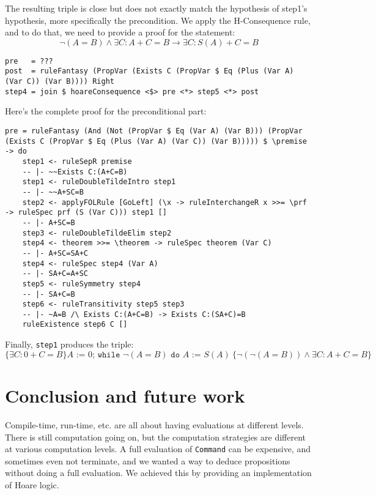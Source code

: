 \documentclass{article}
\begin{document}
The resulting triple is close but does not exactly match the hypothesis of step1's hypothesis, more specifically the precondition. We apply the H-Consequence rule, and to do that, we need to provide a proof for the statement:
$$\neg (A = B) \land \exists C: A + C = B \to \exists C: S(A) + C = B$$

\begin{lstlisting}
pre   = ???
post  = ruleFantasy (PropVar (Exists C (PropVar $ Eq (Plus (Var A) (Var C)) (Var B)))) Right
step4 = join $ hoareConsequence <$> pre <*> step5 <*> post
\end{lstlisting}

Here's the complete proof for the preconditional part:

\begin{lstlisting}
pre = ruleFantasy (And (Not (PropVar $ Eq (Var A) (Var B))) (PropVar (Exists C (PropVar $ Eq (Plus (Var A) (Var C)) (Var B))))) $ \premise -> do
    step1 <- ruleSepR premise
    -- |- ~~Exists C:(A+C=B)
    step1 <- ruleDoubleTildeIntro step1
    -- |- ~~A+SC=B
    step2 <- applyFOLRule [GoLeft] (\x -> ruleInterchangeR x >>= \prf -> ruleSpec prf (S (Var C))) step1 []
    -- |- A+SC=B
    step3 <- ruleDoubleTildeElim step2
    step4 <- theorem >>= \theorem -> ruleSpec theorem (Var C)
    -- |- A+SC=SA+C
    step4 <- ruleSpec step4 (Var A)
    -- |- SA+C=A+SC
    step5 <- ruleSymmetry step4
    -- |- SA+C=B
    step6 <- ruleTransitivity step5 step3
    -- |- ~A=B /\ Exists C:(A+C=B) -> Exists C:(SA+C)=B
    ruleExistence step6 C []
\end{lstlisting}

Finally, \texttt{step1} produces the triple:
$$\{\exists C: 0+C=B\} A \texttt{ := } 0 \texttt{; while } \neg(A = B) \texttt{ do }A\texttt{ := }S(A) \ \{\neg (\neg (A = B)) \land \exists C: A + C = B\}$$

\section{Conclusion and future work}

Compile-time, run-time, etc. are all about having evaluations at different levels. There is still computation going on, but the computation strategies are different at various computation levels. A full evaluation of \texttt{Command} can be expensive, and sometimes even not terminate, and we wanted a way to deduce propositions without doing a full evaluation. We achieved this by providing an implementation of Hoare logic.
\end{document}
